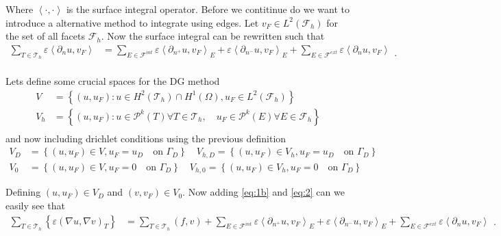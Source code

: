 Where $\left< \cdot ,\cdot  \right>$ is the surface integral operator. Before we contitinue do we want to introduce a
alternative method to integrate using edges. Let $v_{F} \in  L^2\left( \mathcal{F}_{h}  \right)$ for the set of all
facets $\mathcal{F} _{h}$. Now the surface integral can be rewritten such that
\begin{equation}
\label{eq:2}
    \begin{split}
 \sum_{T \in
\mathcal{T} _{h}}^{} \varepsilon  \left<\partial _{n} u , v_{F} \right>
&= \sum_{E \in \mathcal{F} ^{int}}^{}  \varepsilon \left<\partial _{n^{+}} u, v_{F} \right>_{E} + \varepsilon \left<
\partial _{n^{-}} u, v_{F}
\right>_{E} + \sum_{E \in \mathcal{F} ^{ext}}^{} \varepsilon \left<\partial _{n} u, v_{F} \right>   \\
    \end{split}
.\end{equation}

Lets define some crucial spaces for the DG method \[
    \begin{split}
V &=  \left\{ \left( u, u_{F} \right) : u \in H^2\left( \mathcal{T} _{h} \right) \cap H^{1}\left( \Omega  \right)   ,
u_{F} \in  L^2\left( \mathcal{F} _{h} \right)  \right\} \\
V_{h} &=  \left\{ \left( u,u_{F} \right) : u \in  \mathcal{P} ^{k} \left( T \right) \forall T \in  \mathcal{T} _{h} , \quad
u_{F} \in  \mathcal{P} ^{k}\left( E \right)  \forall E  \in \mathcal{F} _{h}   \right\} \\
    \end{split}
\]
and now including drichlet conditions using the previous definition \[
\begin{split}
    V_{D} & = \left\{ \left( u,u_{F} \right) \in V , u_{F} = u_{D} \quad  \text{on } \Gamma _{D}  \right\} \quad
    V_{h,D}  = \left\{ \left( u, u_{F} \right) \in  V_{h}, u_{F} = u_{D} \quad  \text{on } \Gamma _{D}  \right\} \\
    V_{0} & = \left\{ \left( u,u_{F} \right) \in V , u_{F} = 0 \quad  \text{on } \Gamma _{D}  \right\} \quad
    V_{h,0}  = \left\{ \left( u, u_{F} \right) \in  V_{h}, u_{F} = 0 \quad  \text{on } \Gamma _{D}  \right\}
\end{split}
\]

Defining  $\left( u, u_{F} \right) \in  V_{D} $ and $\left( v, v_{F} \right) \in  V_{0} $.
Now adding \eqref{eq:1b} and \eqref{eq:2} can we easily see that
\begin{equation}
    \label{eq:3a}
    \begin{split}
   \sum_{T \in \mathcal{T} _{h}}^{}
     \left\{ \varepsilon\left( \nabla u, \nabla v \right) _{T}  \right\}
     & = \sum_{T \in \mathcal{T} _{h}}^{}  \left( f,v \right) +\sum_{E \in \mathcal{F} ^{int}}^{}  \varepsilon \left<\partial _{n^{+}} u, v_{F} \right>_{E} + \varepsilon \left<
\partial _{n^{-}} u, v_{F} \right>_{E} + \sum_{E \in \mathcal{F} ^{ext}}^{} \varepsilon \left<\partial _{n} u, v_{F} \right>
    \end{split}
.\end{equation}


